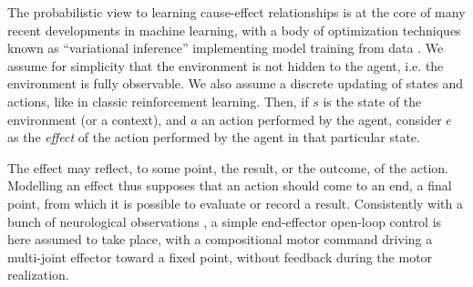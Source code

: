 \documentclass[runningheads]{llncs}
\begin{document}
The probabilistic view to learning cause-effect relationships is at the core of many recent developments in machine learning, with a body of optimization techniques known as “variational inference” implementing model training from data \cite{kingma2013auto}. 
We assume for simplicity that the environment is not hidden to the agent, i.e. the environment is fully observable. We also assume a discrete updating of states and actions, like in classic reinforcement learning.
Then, if $s$ is the state of the environment (or a context), and $a$ an action performed by the agent, consider $e$ as the \emph{effect} of the action performed by the agent in that particular state. 

The effect may reflect, to some point, the result,  or the outcome, of the action. Modelling an effect thus supposes that an action should come to an end, a final point, from which it is possible to evaluate or record a result. Consistently with a bunch of neurological observations \cite{graziano2002complex}, a simple end-effector open-loop control is here assumed to take place, with a compositional motor command \cite{kadmon2019movement} driving a multi-joint effector toward a fixed point, without feedback during the motor realization. 

\end{document}

